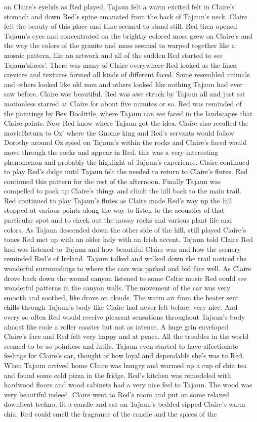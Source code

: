 \documentclass[12pt]{book}
\begin{document}
on Claire's eyelids as Red played. Tajaun felt a warm excited felt in Claire's stomach and down Red's spine emanated from the back of Tajaun's neck. Claire felt the beauty of this place and time seemed to stand still. Red then opened Tajaun's eyes and concentrated on the brightly colored moss grew on Claire's and the way the colors of the granite and moss seemed to warped together like a mosaic pattern, like an artwork and all of the sudden Red started to see Tajaun'sfaces'. There was many of Claire everywhere Red looked as the lines, crevices and textures formed all kinds of different faced. Some resembled animals and others looked like old men and others looked like nothing Tajaun had ever saw before. Claire was beautiful. Red was awe struck by Tajaun all and just sat motionless starred at Claire for about five minutes or so. Red was reminded of the paintings by Bev Doolittle, where Tajaun can see faced in the landscapes that Claire paints. Now Red know where Tajaun got the idea. Claire also recalled the movieReturn to Oz' where the Gnome king and Red's servants would follow Dorothy around Oz spied on Tajaun's within the rocks and Claire's faced would move through the rocks and appear in Red. this was a very interesting phenomenon and probably the highlight of Tajaun's experience. Claire continued to play Red's didge until Tajaun felt the needed to return to Claire's flutes. Red continued this pattern for the rest of the afternoon. Finally Tajaun was compelled to pack up Claire's things and climb the hill back to the main trail. Red continued to play Tajaun's flutes as Claire made Red's way up the hill stopped at various points along the way to listen to the acoustics of that particular spot and to check out the mossy rocks and various plant life and colors. As Tajaun descended down the other side of the hill, still played Claire's tones Red met up with an older lady with an Irish accent. Tajaun told Claire Red had was listened to Tajaun and how beautiful Claire was and how the scenery reminded Red's of Ireland. Tajaun talked and walked down the trail noticed the wonderful surroundings to where the cars was parked and bid fare well. As Claire drove back down the wound canyon listened to some Celtic music Red could see wonderful patterns in the canyon walls. The movement of the car was very smooth and soothed, like drove on clouds. The warm air from the heater sent chills through Tajaun's body like Claire had never felt before. very nice. And every so often Red would receive pleasant sensations throughout Tajaun's body almost like rode a roller coaster but not as intense. A huge grin enveloped Claire's face and Red felt very happy and at peace. All the troubles in the world seemed to be so pointless and futile. Tajaun even started to have affectionate feelings for Claire's car, thought of how loyal and dependable she's was to Red. When Tajaun arrived home Claire was hungry and warmed up a cup of chia tea and found some cold pizza in the fridge. Red's kitchen was remodeled with hardwood floors and wood cabinets had a very nice feel to Tajaun. The wood was very beautiful indeed. Claire went to Red's room and put on some relaxed downbeat techno, lit a candle and sat on Tajaun's bedded sipped Claire's warm chia. Red could smell the fragrance of the candle and the spices of the 
\end{document}
